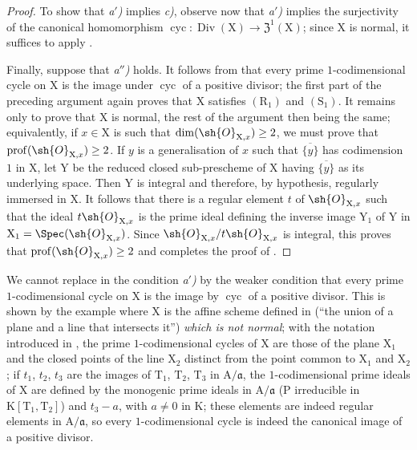\begin{proof}
To show that \emph{a$'$)} implies \emph{c)}, observe now that \emph{a$'$)} implies the surjectivity of the canonical homomorphism $\operatorname{cyc}:\operatorname{Div}(\mathrm{X})\to\mathfrak{Z}^1(\mathrm{X})$; since $\mathrm{X}$ is normal, it suffices to apply .

Finally, suppose that \emph{a$''$)} holds.
It follows from  that every prime $1$-codimensional cycle on $\mathrm{X}$ is the image under $\operatorname{cyc}$ of a positive divisor; the first part of the preceding argument again proves that $\mathrm{X}$ satisfies $(\mathrm{R}_1)$ and $(\mathrm{S}_1)$.
It remains only to prove that $\mathrm{X}$ is normal, the rest of the argument then being the same; equivalently, if $x\in\mathrm{X}$ is such that $\dim(\sh{O}_{\mathrm{X},x})\geq 2$, we must prove that $\operatorname{prof}(\sh{O}_{\mathrm{X},x})\geq 2$.
If $y$ is a generalisation of $x$ such that $\overline{\{y\}}$ has codimension $1$ in $\mathrm{X}$, let $\mathrm{Y}$ be the reduced closed sub-prescheme of $\mathrm{X}$ having $\overline{\{y\}}$ as its
underlying space.
Then $\mathrm{Y}$ is integral and therefore, by hypothesis, regularly immersed in $\mathrm{X}$.
It follows that there is a regular element $t$ of $\sh{O}_{\mathrm{X},x}$ such that the ideal $t\sh{O}_{\mathrm{X},x}$ is the prime ideal defining the inverse image $\mathrm{Y}_1$ of $\mathrm{Y}$ in $\mathrm{X}_1=\Spec(\sh{O}_{\mathrm{X},x})$.
Since $\sh{O}_{\mathrm{X},x}/t\sh{O}_{\mathrm{X},x}$ is integral, this proves that $\operatorname{prof}(\sh{O}_{\mathrm{X},x})\geq 2$ and completes the proof of .
\end{proof}

\begin{remark}[21.7.5]
\label{IV.21.7.5}
We cannot replace in  the condition \emph{a$'$)} by the weaker condition that every prime $1$-codimensional cycle on $\mathrm{X}$ is the image by $\operatorname{cyc}$ of a positive divisor.
This is shown by the example where $\mathrm{X}$ is the affine scheme defined in  (``the union of a plane and a line that intersects it'') \emph{which is not normal};
with the notation introduced in , the prime $1$-codimensional cycles of $\mathrm{X}$ are those of the plane $\mathrm{X}_1$ and the closed points of the line $\mathrm{X}_2$ distinct from the point common to $\mathrm{X}_1$ and $\mathrm{X}_2$;
if $t_1$, $t_2$, $t_3$ are the images of $\mathrm{T}_1$, $\mathrm{T}_2$, $\mathrm{T}_3$ in $\mathrm{A}/\mathfrak{a}$, the $1$-codimensional prime ideals of $\mathrm{X}$ are defined by the monogenic prime ideals in $\mathrm{A}/\mathfrak{a}$ (P irreducible in $\mathrm{K}[\mathrm{T}_1,\mathrm{T}_2]$) and $t_3-a$, with $a\neq 0$ in $\mathrm{K}$;
these elements are indeed regular elements in $\mathrm{A}/\mathfrak{a}$, so every $1$-codimensional cycle is indeed the canonical image of a positive divisor.
\end{remark}

